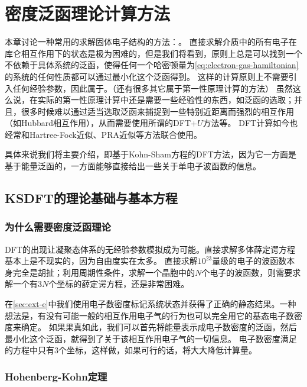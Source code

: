 \chapter{密度泛函理论计算方法}\label{chap:dft}

本章讨论一种常用的求解固体电子结构的方法：。
直接求解介质中的所有电子在库仑相互作用下的状态是极为困难的，但是我们将看到，原则上总是可以找到一个不依赖于具体系统的泛函，使得任何一个哈密顿量为\eqref{eq:electron-gas-hamiltonian}的系统的任何性质都可以通过最小化这个泛函得到。
这样的计算原则上不需要引入任何经验参数，因此属于。（还有很多其它属于第一性原理计算的方法）
虽然这么说，在实际的第一性原理计算中还是需要一些经验性的东西，如泛函的选取；并且，很多时候难以通过适当选取泛函来捕捉到一些特别近距离而强烈的相互作用（如Hubbard相互作用），从而需要使用所谓的DFT+$U$方法等。
DFT计算如今也经常和Hartree-Fock近似、PRA近似等方法联合使用。

具体来说我们将主要介绍，即基于Kohn-Sham方程的DFT方法，因为它一方面是基于能量泛函的，一方面能够直接给出一些关于单电子波函数的信息。

\section{KSDFT的理论基础与基本方程}\label{sec:ksdft-basic-theory}

\subsection{为什么需要密度泛函理论}

DFT的出现让凝聚态体系的无经验参数模拟成为可能。直接求解多体薛定谔方程基本上是不现实的，因为自由度实在太多。
直接求解$10^{23}$量级的电子的波函数本身完全是胡扯；利用周期性条件，求解一个晶胞中的$N$个电子的波函数，则需要求解一个有$3N$个坐标的薛定谔方程，还是非常困难。

在\autoref{sec:ext-e}中我们使用电子数密度标记系统状态并获得了正确的静态结果。一种想法是，有没有可能一般的相互作用电子气的行为也可以完全用它的基态电子数密度来确定。
如果果真如此，我们可以首先将能量表示成电子数密度的泛函，然后最小化这个泛函，就得到了关于该相互作用电子气的一切信息。
电子数密度满足的方程中只有$3$个坐标，这样做，如果可行的话，将大大降低计算量。

\subsection{Hohenberg-Kohn定理}\label{sec:hohenberg-kohn-theorem-spinless}


